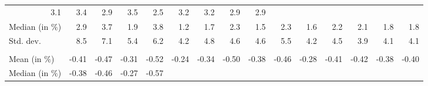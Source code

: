 \begin{tabular}{lllllllllllllll}
  \multicolumn{1}{r}{3.1} &
  \multicolumn{1}{r}{3.4} &
  \multicolumn{1}{r}{2.9} &
  \multicolumn{1}{r}{3.5} &
  \multicolumn{1}{r}{2.5} &
  \multicolumn{1}{r}{3.2} &
  \multicolumn{1}{r}{3.2} &
  \multicolumn{1}{r}{2.9} &
  \multicolumn{1}{r}{2.9} \\
\multicolumn{1}{l}{\hspace{2em}Median (in $\%$)} &
  \multicolumn{1}{|r}{2.9} &
  \multicolumn{1}{r}{3.7} &
  \multicolumn{1}{r}{1.9} &
  \multicolumn{1}{r}{3.8} &
  \multicolumn{1}{r}{1.2} &
  \multicolumn{1}{r}{1.7} &
  \multicolumn{1}{r}{2.3} &
  \multicolumn{1}{r}{1.5} &
  \multicolumn{1}{r}{2.3} &
  \multicolumn{1}{r}{1.6} &
  \multicolumn{1}{r}{2.2} &
  \multicolumn{1}{r}{2.1} &
  \multicolumn{1}{r}{1.8} &
  \multicolumn{1}{r}{1.8} \\
\multicolumn{1}{l}{\hspace{2em}Std. dev.} &
  \multicolumn{1}{|r}{8.5} &
  \multicolumn{1}{r}{7.1} &
  \multicolumn{1}{r}{5.4} &
  \multicolumn{1}{r}{6.2} &
  \multicolumn{1}{r}{4.2} &
  \multicolumn{1}{r}{4.8} &
  \multicolumn{1}{r}{4.6} &
  \multicolumn{1}{r}{4.6} &
  \multicolumn{1}{r}{5.5} &
  \multicolumn{1}{r}{4.2} &
  \multicolumn{1}{r}{4.5} &
  \multicolumn{1}{r}{3.9} &
  \multicolumn{1}{r}{4.1} &
  \multicolumn{1}{r}{4.1} \\
\multicolumn{1}{l}{\hspace{1em}{\textit{Elasticity} ($\widehat{\beta}$)}} &
  \multicolumn{1}{|r}{} &
  \multicolumn{1}{r}{} &
  \multicolumn{1}{r}{} &
  \multicolumn{1}{r}{} &
  \multicolumn{1}{r}{} &
  \multicolumn{1}{r}{} &
  \multicolumn{1}{r}{} &
  \multicolumn{1}{r}{} &
  \multicolumn{1}{r}{} &
  \multicolumn{1}{r}{} &
  \multicolumn{1}{r}{} &
  \multicolumn{1}{r}{} &
  \multicolumn{1}{r}{} &
  \multicolumn{1}{r}{} \\
\multicolumn{1}{l}{\hspace{2em}Mean (in $\%$)} &
  \multicolumn{1}{|r}{-0.41} &
  \multicolumn{1}{r}{-0.47} &
  \multicolumn{1}{r}{-0.31} &
  \multicolumn{1}{r}{-0.52} &
  \multicolumn{1}{r}{-0.24} &
  \multicolumn{1}{r}{-0.34} &
  \multicolumn{1}{r}{-0.50} &
  \multicolumn{1}{r}{-0.38} &
  \multicolumn{1}{r}{-0.46} &
  \multicolumn{1}{r}{-0.28} &
  \multicolumn{1}{r}{-0.41} &
  \multicolumn{1}{r}{-0.42} &
  \multicolumn{1}{r}{-0.38} &
  \multicolumn{1}{r}{-0.40} \\
\multicolumn{1}{l}{\hspace{2em}Median (in $\%$)} &
  \multicolumn{1}{|r}{-0.38} &
  \multicolumn{1}{r}{-0.46} &
  \multicolumn{1}{r}{-0.27} &
  \multicolumn{1}{r}{-0.57} &

\end{tabular}
